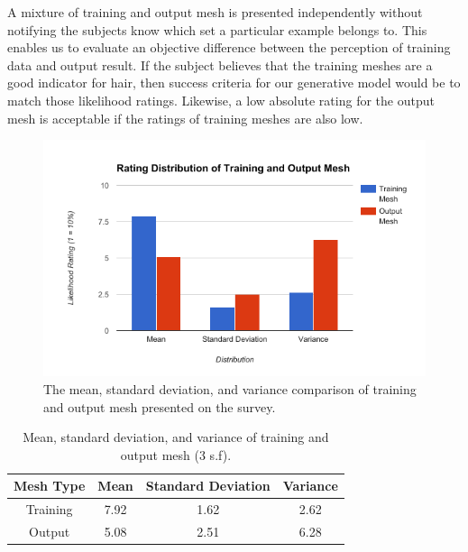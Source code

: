 \documentclass[ %
author={Dillon Keith Diep},
supervisor={Dr. Carl Henrik Ek},
degree={MEng},
title={ART-CG:},
subtitle={Assisted Real-time Content Generation of 3D Hair by Learning Manifolds},
type={Research},
year={2017} ]{dissertation}
\begin{document}
A mixture of training and output mesh is presented independently without notifying the subjects know which set a particular example belongs to. This enables us to evaluate an objective difference between the perception of training data and output result. If the subject believes that the training meshes are a good indicator for hair, then success criteria for our generative model would be to match those likelihood ratings. Likewise, a low absolute rating for the output mesh is acceptable if the ratings of training meshes are also low.

\begin{figure}[!h]
	\centering
	\includegraphics[scale=0.6]{images/meshRating}
	\caption{The mean, standard deviation, and variance comparison of training and output mesh presented on the survey.}
\end{figure}

\begin{table}[!h]
	\centering
	\begin{tabular}{|c|c|c|c|}
		\hline
		Mesh Type 	& Mean		& Standard Deviation	& Variance\\
		\hline
		Training 	& 7.92      & 1.62      			& 2.62\\
		\hline
		Output 		& 5.08 		& 2.51 					& 6.28 \\
		\hline
	\end{tabular}
	\caption{Mean, standard deviation, and variance of training and output mesh (3 s.f).}
\end{table}
\end{document}
